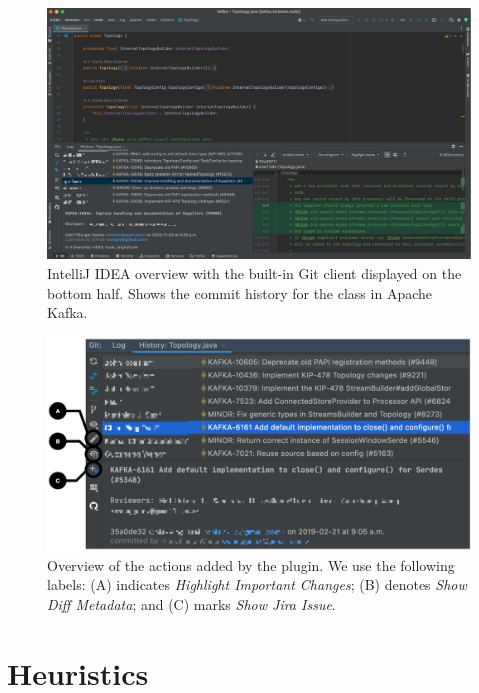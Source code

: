 \begin{figure}
    \includegraphics[width=\textwidth]{./images/intellij-overview.png}
    \caption{
        IntelliJ IDEA overview with the built-in Git client displayed on the bottom half. Shows the commit history for the  class in Apache Kafka.
    }
    \label{fig:IntelliJ-Overview}
\end{figure}

\begin{figure}
    \includegraphics[width=\textwidth]{./images/intelligent-history-overview.png}
    \caption{
        Overview of the actions added by the  plugin. We use the following labels: (A) indicates \textit{Highlight Important Changes}; (B) denotes \textit{Show Diff Metadata}; and (C) marks \textit{Show Jira Issue}.
    }
    \label{fig:Intelligent-History-Overview}
\end{figure}

\section{Heuristics}
\label{sec:Heuristics}

